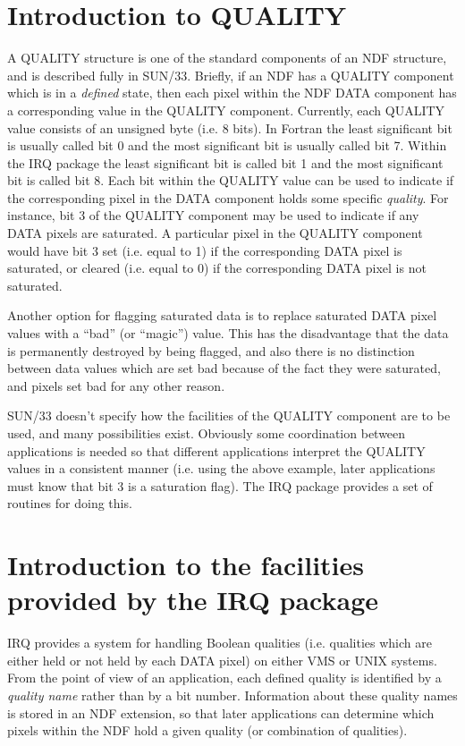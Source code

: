 \section {Introduction to QUALITY}
A QUALITY structure is one of the standard components of an NDF structure, and
is described fully in SUN/33. Briefly, if an NDF has a QUALITY component which
is in a {\em defined} state, then each pixel within the NDF DATA component has a
corresponding value in the QUALITY component. Currently, each QUALITY value
consists of an unsigned byte (i.e. 8 bits). In Fortran the least significant bit
is usually called bit 0 and the most significant bit is usually called bit 7.
Within the IRQ package the least significant bit is called bit 1 and the most
significant bit is called bit 8. Each bit within the QUALITY value can be used
to indicate if the corresponding pixel in the DATA component holds some specific
{\em quality}. For instance, bit 3 of the QUALITY component may be used to
indicate if any DATA pixels are saturated. A particular pixel in the QUALITY
component would have bit 3 set (i.e. equal to 1) if the corresponding DATA pixel
is saturated, or cleared (i.e. equal to 0) if the corresponding DATA pixel is
not saturated. 

Another option for flagging saturated data is to replace saturated DATA pixel
values with a ``bad'' (or ``magic'') value. This has the disadvantage that the
data is permanently destroyed by being flagged, and also there is no distinction
between data values which are set bad because of the fact they were saturated,
and pixels set bad for any other reason. 

SUN/33 doesn't specify how the facilities of the QUALITY component are to be 
used, and many possibilities exist. Obviously some coordination between 
applications is needed so that different applications interpret the QUALITY 
values in a consistent manner (i.e. using the above example, later applications
must know that bit 3 is a saturation flag). The IRQ package provides a set of
routines for doing this.

\section {Introduction to the facilities provided by the IRQ package}
\label {SEC:IRQ}
IRQ provides a system for handling Boolean qualities (i.e. qualities which are
either held or not held by each DATA pixel) on either VMS or UNIX systems. From
the point of view of an application, each defined quality is identified by a
{\em quality name} rather than by a bit number. Information about these quality
names is stored in an NDF extension, so that later applications can determine
which pixels within the NDF hold a given quality (or combination of qualities). 

